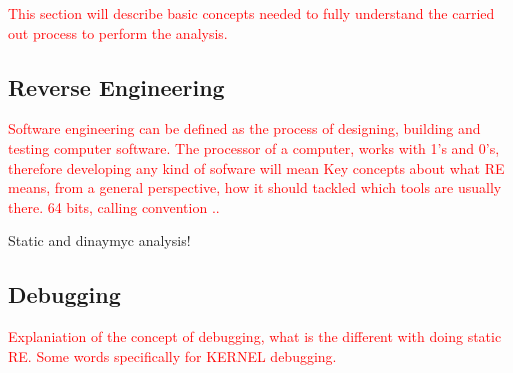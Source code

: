     \textcolor{red}{This section will describe basic concepts needed to fully understand the carried out process to perform the analysis.}

\subsection{Reverse Engineering}
\textcolor{red}{Software engineering can be defined as the process of designing, building and testing computer software. The processor of a computer, works with 1's and 0's, therefore developing any kind of sofware will mean }
\textcolor{red}{Key concepts about what RE means, from a general perspective, how it should tackled which tools are usually there.  64 bits, calling convention .. }


Static and dinaymyc analysis! 

\subsection{Debugging}\label{debugging}
\textcolor{red}{Explaniation of the concept of debugging, what is the different with doing static RE. Some words specifically for KERNEL debugging. }